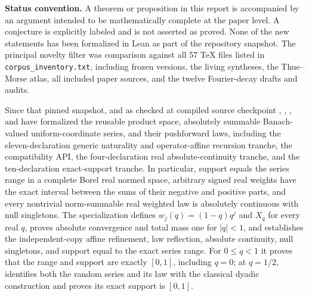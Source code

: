 \documentclass[11pt]{article}
\numberwithin{equation}{section}
\theoremstyle{definition}
\theoremstyle{remark}
\begin{document}
\begin{abstract}
The word \emph{new} is used only in a corpus-relative sense: these statements were not found
in the 57 TeX sources inspected in the specified repository snapshot.  No claim of global
priority is made.  Proven statements are separated sharply from conjectural transseries,
strict log-concavity, Edgeworth, inverse-phase, and arithmetic-collision problems.
Deterministic numerical experiments and all plotting code accompany the report.
\end{abstract}

\begin{boxedremark}
\textbf{Status convention.}
A theorem or proposition in this report is accompanied by an argument intended to be
mathematically complete at the paper level.  A conjecture is explicitly labeled and is not
asserted as proved.  None of the new statements has been formalized in Lean as part of the
repository snapshot.  The principal novelty filter was comparison against all 57 TeX files
listed in \texttt{corpus\_inventory.txt}, including frozen versions, the living syntheses,
the Thue--Morse atlas, all included paper sources, and the twelve Fourier-decay drafts and
audits.

Since that pinned snapshot, and as checked at compiled source checkpoint
, ,
, and  have
formalized the reusable product space, absolutely summable Banach-valued uniform-coordinate
series, and their pushforward laws, including the eleven-declaration generic naturality and
operator-affine recursion tranche, the compatibility API, the four-declaration real
absolute-continuity tranche, and the ten-declaration exact-support tranche.  In particular,
support equals the series range in a complete Borel real normed space, arbitrary signed real
weights have the exact interval between the sums of their negative and positive parts, and
every nontrivial norm-summable real weighted law is absolutely continuous with null
singletons.  The specialization
 defines
$w_j(q)=(1-q)q^j$ and $X_q$ for every real $q$, proves absolute convergence and total mass
one for $|q|<1$, and establishes the independent-copy affine refinement, law reflection,
absolute continuity, null singletons, and support equal to the exact series range.  For
$0\le q<1$ it proves that the range and support are exactly $[0,1]$, including $q=0$; at
$q=1/2$,
 identifies both the random series and its law with
the classical dyadic construction and proves its exact support is $[0,1]$.


\end{boxedremark}
\end{document}
